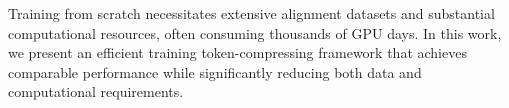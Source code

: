 Training from scratch necessitates extensive alignment datasets and substantial computational resources, often consuming thousands of GPU days. In this work, we present an efficient training token-compressing framework that achieves comparable performance while significantly reducing both data and computational requirements.





 
